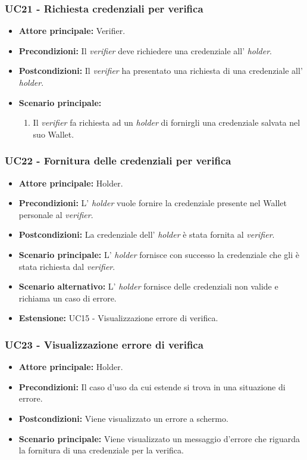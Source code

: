 \subsubsection{UC21 - Richiesta credenziali per verifica}
\begin{itemize}
\item \textbf{Attore principale:} Verifier.
\item \textbf{Precondizioni:} Il \textit{verifier} deve richiedere una credenziale all' \textit{holder}.
\item \textbf{Postcondizioni:} Il \textit{verifier} ha presentato una richiesta di una credenziale all' \textit{holder}.
\item \textbf{Scenario principale:} 
    \begin{enumerate}
        \item Il \textit{verifier} fa richiesta ad un \textit{holder} di fornirgli una credenziale salvata nel suo Wallet.
    \end{enumerate}
\end{itemize}

\subsubsection{UC22 - Fornitura delle credenziali per verifica}
\begin{itemize}
\item \textbf{Attore principale:} Holder. 
\item \textbf{Precondizioni:} L’ \textit{holder} vuole fornire la credenziale presente nel Wallet personale al \textit{verifier}.
\item \textbf{Postcondizioni:} La credenziale dell’ \textit{holder} è stata fornita al \textit{verifier}.
\item \textbf{Scenario principale:} L' \textit{holder} fornisce con successo la credenziale che gli è stata richiesta dal \textit{verifier}.
\item \textbf{Scenario alternativo:} L' \textit{holder} fornisce delle credenziali non valide e richiama un caso di errore.
\item \textbf{Estensione:} UC15 - Visualizzazione errore di verifica.
\end{itemize}

\subsubsection{UC23 - Visualizzazione errore di verifica}
\begin{itemize}
    \item \textbf{Attore principale:} Holder.
    \item \textbf{Precondizioni:} Il caso d'uso da cui estende si trova in una situazione di errore.
    \item \textbf{Postcondizioni:} Viene visualizzato un errore a schermo. 
    \item \textbf{Scenario principale:} Viene visualizzato un messaggio d’errore che riguarda la fornitura di una credenziale per la verifica.
\end{itemize}

